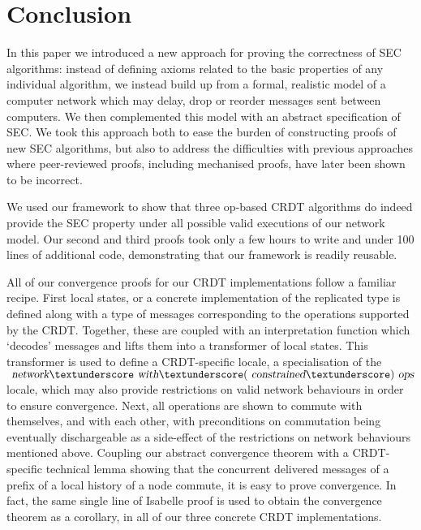 \documentclass[acmlarge,review,anonymous]{acmart}\settopmatter{printfolios=true}
\begin{document}








\section{Conclusion}
\label{sect.conclusion}

In this paper we introduced a new approach for proving the correctness of SEC algorithms: instead of defining axioms related to the basic properties of any individual algorithm, we instead build up from a formal, realistic model of a computer network which may delay, drop or reorder messages sent between computers.
We then complemented this model with an abstract specification of SEC.
We took this approach both to ease the burden of constructing proofs of new SEC algorithms, but also to address the difficulties with previous approaches where peer-reviewed proofs, including mechanised proofs, have later been shown to be incorrect.

We used our framework to show that three op-based CRDT algorithms do indeed provide the SEC property under all possible valid executions of our network model.
Our second and third proofs took only a few hours to write and under 100 lines of additional code, demonstrating that our framework is readily reusable.

All of our convergence proofs for our CRDT implementations follow a familiar recipe.
First local states, or a concrete implementation of the replicated type is defined along with a type of messages corresponding to the operations supported by the CRDT.
Together, these are coupled with an interpretation function which `decodes' messages and lifts them into a transformer of local states.
This transformer is used to define a CRDT-specific locale, a specialisation of the $\isa{network}{\isacharunderscore}\isa{with}{\isacharunderscore}(\isa{constrained}{\isacharunderscore})\isa{ops}$ locale, which may also provide restrictions on valid network behaviours in order to ensure convergence.
Next, all operations are shown to commute with themselves, and with each other, with preconditions on commutation being eventually dischargeable as a side-effect of the restrictions on network behaviours mentioned above.
Coupling our abstract convergence theorem with a CRDT-specific technical lemma showing that the concurrent delivered messages of a prefix of a local history of a node commute, it is easy to prove convergence.
In fact, the same single line of Isabelle proof is used to obtain the convergence theorem as a corollary, in all of our three concrete CRDT implementations.
\end{document}

